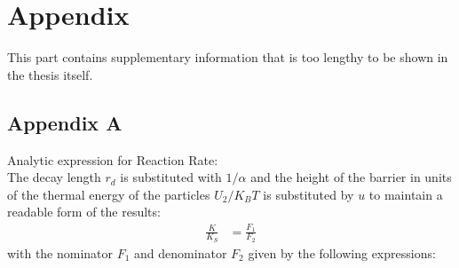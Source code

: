 \chapter{Appendix}
This part contains supplementary information that is too lengthy to be shown in the thesis itself.
\newpage
\section{Appendix A}
Analytic expression for Reaction Rate: \\
The decay length $r_d$ is substituted with $1/\alpha$ and the height of the barrier in units of the thermal energy of the particles $U_2/K_B T$ is substituted by $u$ to maintain a readable form of the results:
\begin{align}
    \frac{K}{K_{S}} &= \frac{F_1}{F_2}
    \label{two_state_rate}
\end{align}
with the nominator $F_1$ and denominator $F_2$ given by the following expressions:
